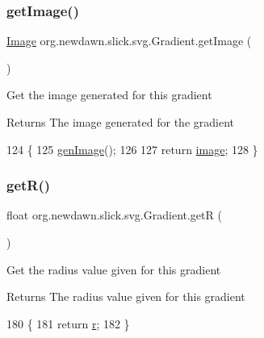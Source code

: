 \subsubsection{\texorpdfstring{get\+Image()}{getImage()}}
{\footnotesize\ttfamily \mbox{\hyperlink{classorg_1_1newdawn_1_1slick_1_1_image}{Image}} org.\+newdawn.\+slick.\+svg.\+Gradient.\+get\+Image (\begin{DoxyParamCaption}{ }\end{DoxyParamCaption})\hspace{0.3cm}{\ttfamily [inline]}}

Get the image generated for this gradient

\begin{DoxyReturn}{Returns}
The image generated for the gradient 
\end{DoxyReturn}

\begin{DoxyCode}
124                             \{
125         \mbox{\hyperlink{classorg_1_1newdawn_1_1slick_1_1svg_1_1_gradient_ac9a99756ee5b6e6badc5a75286102880}{genImage}}();
126         
127         \textcolor{keywordflow}{return} \mbox{\hyperlink{classorg_1_1newdawn_1_1slick_1_1svg_1_1_gradient_ac3ba3aa0d42efe130b9b1e6a0da020cb}{image}};
128     \}
\end{DoxyCode}
\mbox{\label{classorg_1_1newdawn_1_1slick_1_1svg_1_1_gradient_a148b2258e3cd0b6d7157a2abfd3be593}} 
\subsubsection{\texorpdfstring{get\+R()}{getR()}}
{\footnotesize\ttfamily float org.\+newdawn.\+slick.\+svg.\+Gradient.\+getR (\begin{DoxyParamCaption}{ }\end{DoxyParamCaption})\hspace{0.3cm}{\ttfamily [inline]}}

Get the radius value given for this gradient

\begin{DoxyReturn}{Returns}
The radius value given for this gradient 
\end{DoxyReturn}

\begin{DoxyCode}
180                         \{
181         \textcolor{keywordflow}{return} \mbox{\hyperlink{classorg_1_1newdawn_1_1slick_1_1svg_1_1_gradient_a9eb9e743742ccbcdbcd4118d9457de24}{r}};
182     \}
\end{DoxyCode}
\mbox{\label{classorg_1_1newdawn_1_1slick_1_1svg_1_1_gradient_a797b696ffa9ef0cfee7f1dd99a884f35}} 
